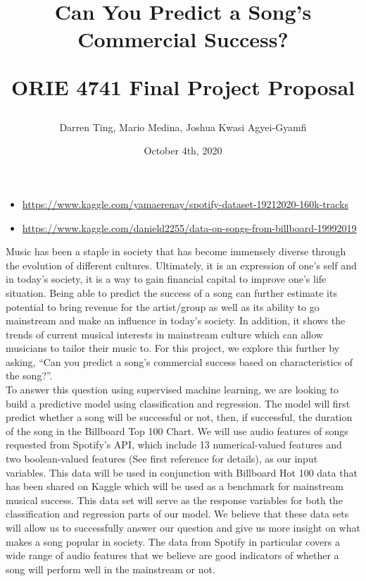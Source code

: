 \documentclass[letterpaper]{article}
\title{Can You Predict a Song's Commercial Success?\\
\begin{Large}ORIE 4741 Final Project Proposal\end{Large}}
\author{Darren Ting, Mario Medina, Joshua Kwasi Agyei-Gyamfi}
\date{October 4th, 2020}
\begin{document}
\maketitle

\begin{itemize}
  \item \url{https://www.kaggle.com/yamaerenay/spotify-dataset-19212020-160k-tracks} 
  \item \url{https://www.kaggle.com/danield2255/data-on-songs-from-billboard-19992019}
\end{itemize}
\indent Music has been a staple in society that has become immensely diverse through the evolution of different cultures. Ultimately, it is an expression of one’s self and in today’s society, it is a way to gain financial capital to improve one’s life situation. Being able to predict the success of a song can further estimate its potential to bring revenue for the artist/group as well as its ability to go mainstream and make an influence in today’s society. In addition, it shows the trends of current musical interests in mainstream culture which can allow musicians to tailor their music to. For this project, we explore this further by asking, “Can you predict a song’s commercial success based on characteristics of the song?”. \\ 
\indent To answer this question using supervised machine learning, we are looking to build a predictive model using classification and regression. The model will first predict whether a song will be successful or not, then, if successful, the duration of the song in the Billboard Top 100 Chart. We will use audio features of songs requested from Spotify’s API, which include 13 numerical-valued features and two boolean-valued features (See first reference for details), as our input variables. This data will be used in conjunction with Billboard Hot 100 data that has been shared on Kaggle which will be used as a benchmark for mainstream musical success. This data set will serve as the response variables for both the classification and regression parts of our model. We believe that these data sets will allow us to successfully answer our question and give us more insight on what makes a song popular in society. The data from Spotify in particular covers a wide range of audio features that we believe are good indicators of whether a song will perform well in the mainstream or not.
\end{document}
